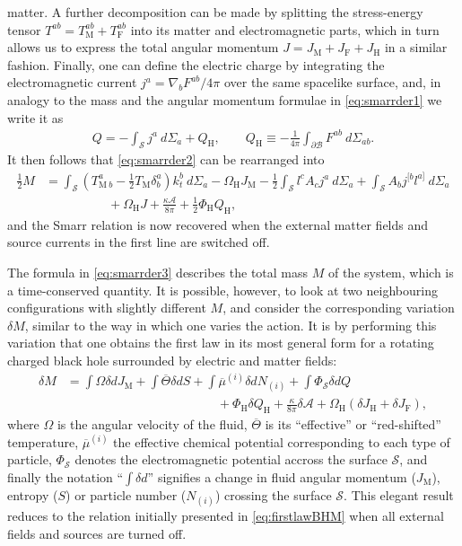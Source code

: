 \documentclass[
twoside,openright,frontopenright]{dmathesis}
\newcommand{\nn}{\nonumber}
\begin{document}
matter. A further decomposition can be made by splitting the stress-energy
tensor $T^{ab} = T_\mathrm{M}^{ab} + T_\mathrm{F}^{ab}$ into its matter and
electromagnetic parts, which in turn allows us to express the total angular
momentum $J = J_\mathrm{M} + J_\mathrm{F} + J_\mathrm{H}$ in a similar
fashion. Finally, one can define the electric charge by integrating the
electromagnetic current $j^a = \nabla_b F^{ab}/4\pi$ over the same spacelike
surface, and, in analogy to the mass and the angular momentum formulae in
\cref{eq:smarrder1} we write it as
\begin{align}
  Q = -\int_\mathcal{S} j^a ~d\Sigma_a + Q_\mathrm{H}, \qquad Q_\mathrm{H} \equiv -\frac{1}{4\pi}\int_{\partial\mathcal{B}}F^{ab} ~ d\Sigma_{ab}.
\end{align}
It then follows that \cref{eq:smarrder2} can be rearranged into
\begin{align}
  \label{eq:smarrder3}
  \frac12 M &= \int_\mathcal{S} \left(T^a_{\mathrm{M}~b} - \frac12 T_\mathrm{M}
  \delta^a_b\right)k_t^b~d\Sigma_a - \Omega_\mathrm{H} J_\mathrm{M} - \frac12
\int_\mathcal{S} l^c A_c j^a~d\Sigma_a + \int_\mathcal{S} A_b j^{[b}l^{a]}~d\Sigma_a \nn\\
&\hspace{5em}+ \Omega_\mathrm{H} J + \frac{\kappa \mathcal{A}}{8\pi} + \frac12
\Phi_\mathrm{H} Q_\mathrm{H},
\end{align}
and the Smarr relation is now recovered when the external matter fields and
source currents in the first line are switched off.

The formula in \cref{eq:smarrder3} describes the total mass $M$ of the system,
which is a time-conserved quantity. It is possible, however, to look at two
neighbouring configurations with slightly different $M$, and consider the
corresponding variation $\delta M$, similar to the way in which one varies the
action. It is by performing this variation that one obtains the first law in its
most general form for a rotating charged black hole surrounded by electric and
matter fields:
\begin{align}
  \label{eq:firstlawder1}
  \delta M &= \int \Omega\delta dJ_\mathrm{M} + \int \overline{\Theta}\delta dS +
  \int \overline{\mu}^{(i)} \delta dN_{(i)} +\int \Phi_\mathcal{S}\delta dQ \nn\\
  &\hspace{12em}+ \Phi_\mathrm{H} \delta
  Q_\mathrm{H} + \frac{\kappa}{8\pi}\delta\mathcal{A} + \Omega_\mathrm{H}(\delta
  J_\mathrm{H}+\delta J_\mathrm{F}),
\end{align}
where $\Omega$ is the angular velocity of the fluid, $\overline{\Theta}$ is its
``effective'' or ``red-shifted'' temperature, $\overline{\mu}^{(i)}$ the
effective chemical potential corresponding to each type of particle,
$\Phi_\mathcal{S}$ denotes the electromagnetic potential accross the surface
$\mathcal{S}$, and finally the notation ``$\int\delta d$'' signifies a change in
fluid angular momentum ($J_\mathrm{M}$), entropy ($S$) or particle number
($N_{(i)}$) crossing the surface $\mathcal{S}$. This elegant result reduces to
the relation initially presented in \cref{eq:firstlawBHM} when all external
fields and sources are turned off.
\end{document}
